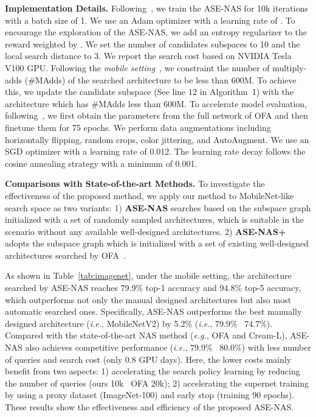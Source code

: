 \documentclass[lettersize,journal]{IEEEtran}
\newcommand{\sexyname}{ASE-NAS\xspace}
\newcommand{\sexynameplus}{ASE-NAS+\xspace}
\def\eg{\emph{e.g.}} \def\Eg{\emph{E.g.}}
\def\ie{\emph{i.e.}} \def\Ie{\emph{I.e.}}
\begin{document}
\textbf{Implementation Details.}
Following~\cite{pham2018efficient}, we train the \sexyname for 10k iterations with a batch size of 1.
We use an Adam optimizer with a learning rate of .
To encourage the exploration of the \sexyname, we add an entropy regularizer to the reward weighted by .
We set the number of candidates subspaces  to 10 and the local search distance  to 3.
We report the search cost based on NVIDIA Tesla V100 GPU.
Following the \textit{mobile setting}~\cite{liu2018darts}, we constraint the number of multiply-adds (\#MAdds) of the searched architecture to be less than 600M.
To achieve this, we update the candidate subspace (See line 12 in Algorithm~1) with the architecture which has \#MAdds less than 600M.
To accelerate model evaluation, following~\cite{Cai2020Once,lu2020neural}, we first obtain the parameters from the full network of OFA and then finetune them for 75 epochs. 
We perform data augmentations including horizontally flipping, random crops, color jittering, and AutoAugment.
We use an SGD optimizer with a learning rate of 0.012.
The learning rate decay follows the cosine annealing strategy with a minimum of 0.001.




\textbf{Comparisons with State-of-the-art Methods.}
To investigate the effectiveness of the proposed method, we apply our method to MobileNet-like search space as two variants:
1) \textbf{\sexyname} searches based on the subspace graph initialized with a set of randomly sampled architectures, which is suitable in the scenario without any available well-designed architectures.
2) \textbf{\sexynameplus} adopts the subspace graph which is initialized with a set of existing well-designed architectures searched by OFA~\cite{Cai2020Once}.

As shown in Table~\ref{tab:imagenet}, under the mobile setting, the architecture searched by \sexyname reaches 79.9\% top-1 accuracy and 94.8\% top-5 accuracy, which outperforms not only the manual designed architectures but also most automatic searched ones.
Specifically, \sexyname outperforms the best manually designed architecture (\ie, MobileNetV2) by 5.2\% (\ie, 79.9\% \vs~74.7\%).
Compared with the state-of-the-art NAS method (\eg, OFA and Cream-L), \sexyname also achieves competitive performance (\ie, 79.9\% \vs~80.0\%) with less number of queries and search cost (only 0.8 GPU days).
Here, the lower costs mainly benefit from two aspects: 1) accelerating the search policy learning by reducing the number of queries (ours 10k \vs~OFA 20k); 2) accelerating the supernet training by using a proxy dataset (ImageNet-100) and early stop (training 90 epochs).
These results show the effectiveness and efficiency of the proposed \sexyname.
\end{document}
